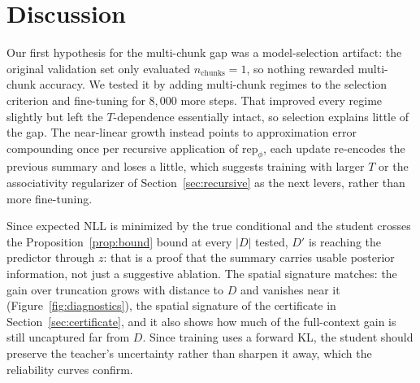 \documentclass{article}
\newcommand{\Dfar}{D'}
\newcommand{\Dloc}{D}
\newcommand{\rep}{\mathrm{rep}}
\begin{document}
\begin{table}[t]
\centering
\caption{Context selection on TabArena regression (OpenML study 457).
Budget $n = 0.1N$. Average rank and mean RMSE on standardized targets
(lower is better). Bold marks the best budget-matched method.}
\label{tab:tabarena}

\end{table}

\section{Discussion}
\label{sec:discussion}

Our first hypothesis for the multi-chunk gap was a model-selection
artifact: the original validation set only evaluated
$n_{\mathrm{chunks}}=1$, so nothing rewarded multi-chunk accuracy. We
tested it by adding multi-chunk regimes to the selection criterion and
fine-tuning for $8{,}000$ more steps. That improved every regime slightly
but left the $T$-dependence essentially intact, so selection explains little of the
gap. The near-linear growth instead points to approximation error
compounding once per recursive application of $\rep_\phi$, each update
re-encodes the previous summary and loses a little, which suggests
training with larger $T$ or the associativity regularizer of
Section~\ref{sec:recursive} as the next levers, rather than more
fine-tuning.

Since expected NLL is minimized by the true conditional and the student
crosses the Proposition~\ref{prop:bound} bound at every $|\Dloc|$ tested,
$\Dfar$ is reaching the predictor through $z$: that is a proof that the
summary carries usable posterior information, not just a suggestive ablation.
The spatial signature matches: the gain over truncation grows with distance
to $\Dloc$ and vanishes near it (Figure~\ref{fig:diagnostics}), the spatial
signature of the certificate in Section~\ref{sec:certificate},
and it also shows how much of the full-context gain is still uncaptured far
from $\Dloc$. Since training uses a forward KL, the student should preserve
the teacher's uncertainty rather than sharpen it away, which the reliability
curves confirm.
\end{document}
